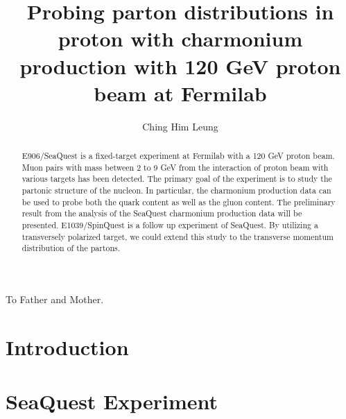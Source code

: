 \documentclass{uiucthesis2021}
\begin{document}
\title{Probing parton distributions in proton with charmonium production with
	120 GeV proton beam at Fermilab}
\author{Ching Him Leung}
\phdthesis
{}
\maketitle

\frontmatter

\begin{abstract}
E906/SeaQuest is a fixed-target experiment at Fermilab with a 120 GeV proton 
beam. Muon pairs with mass between 2 to 9 GeV from the interaction of 
proton beam with various targets has been detected. The primary goal of the 
experiment is to study the partonic structure of the nucleon. In particular, 
the charmonium production data can be used to probe both the quark content as 
well as the gluon content. The preliminary result from the analysis of the 
SeaQuest charmonium production data will be presented.  E1039/SpinQuest is a 
follow up experiment of SeaQuest. By utilizing a transversely polarized target,
we could extend this study to the transverse momentum distribution of the 
partons. 
\end{abstract}

\begin{dedication}
To Father and Mother.
\end{dedication}



{
	\hypersetup{linkcolor=black}  %
	\tableofcontents
}


\mainmatter

\chapter{Introduction}


\chapter{SeaQuest Experiment}

\end{document}
